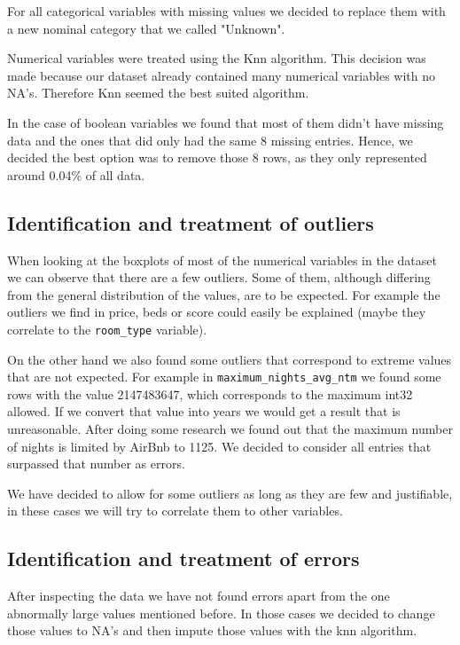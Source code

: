 For all categorical variables with missing values we decided to 
replace them with a new nominal category that we called "Unknown".

Numerical variables were treated using the Knn algorithm. This decision
was made because our dataset already contained many numerical variables
with no NA's. Therefore Knn seemed the best suited algorithm.

In the case of boolean variables we found that most of them didn't have
missing data and the ones that did only had the same 8 missing entries.
Hence, we decided the best option was to remove those 8 rows, as they
only represented around 0.04\% of all data.

\subsection{Identification and treatment of outliers}

When looking at the boxplots of most of the numerical variables in the dataset
we can observe that there are a few outliers. Some of them, although differing
from the general distribution of the values, are to be expected. For example the
outliers we find in price, beds or score could easily be explained (maybe they
correlate to the \texttt{room\_type} variable).

On the other hand we also found some outliers that correspond to extreme values
that are not expected. For example in \texttt{maximum\_nights\_avg\_ntm} we
found some rows with the value 2147483647, which corresponds to the maximum
int32 allowed. If we convert that value into years we would get a result that is
unreasonable. After doing some research we found out that the maximum number of nights is limited by AirBnb to 1125. We decided to consider all entries that surpassed that number as errors. 

We have decided to allow for some outliers as long as they are few and
justifiable, in these cases we will try to correlate them to other variables.

\subsection{Identification and treatment of errors}

After inspecting the data we have not found errors apart from the one abnormally
large values mentioned before. In those cases we decided to change those values to NA's and then impute those values with the knn algorithm.

